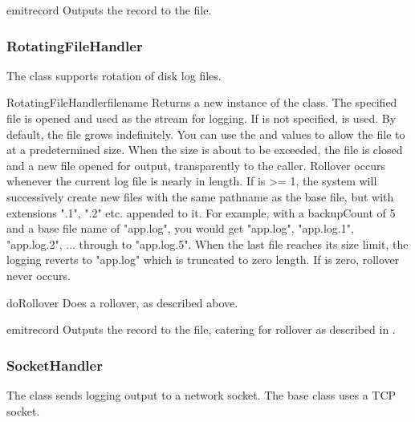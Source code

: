 \begin{methoddesc}{emit}{record}
Outputs the record to the file.
\end{methoddesc}

\subsubsection{RotatingFileHandler}

The  class supports rotation of disk log files.

\begin{classdesc}{RotatingFileHandler}{filename}
Returns a new instance of the  class. The
specified file is opened and used as the stream for logging. If
 is not specified,  is used. By default, the
file grows indefinitely. You can use the  and
 values to allow the file to  at a
predetermined size. When the size is about to be exceeded, the file is
closed and a new file opened for output, transparently to the
caller. Rollover occurs whenever the current log file is nearly
 in length. If  is >= 1, the system
will successively create new files with the same pathname as the base
file, but with extensions ".1", ".2" etc. appended to it. For example,
with a backupCount of 5 and a base file name of "app.log", you would
get "app.log", "app.log.1", "app.log.2", ... through to
"app.log.5". When the last file reaches its size limit, the logging
reverts to "app.log" which is truncated to zero length. If
 is zero, rollover never occurs.
\end{classdesc}

\begin{methoddesc}{doRollover}{}
Does a rollover, as described above.
\end{methoddesc}

\begin{methoddesc}{emit}{record}
Outputs the record to the file, catering for rollover as described
in .
\end{methoddesc}

\subsubsection{SocketHandler}

The  class sends logging output to a network
socket. The base class uses a TCP socket.


